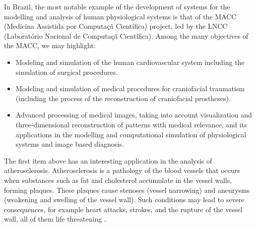In Brazil, the most notable example of the development of systems for the modelling and analysis of human physiological systems is that of the MACC (Medicina Assistida por Computa\c{c}\~a Cient\'ifica) project, led by the LNCC (Laborat\'orio Nacional de Computa\c{c}\~a Cient\'ifica). Among the many objectives of the MACC, we may highlight: 

\begin{itemize}
\item Modeling and simulation of the human cardiovascular system including the simulation of surgical procedures.
\item Modeling and simulation of medical procedures for craniofacial traumatism (including the process of the reconstruction of craniofacial prostheses).
\item Advanced processing of medical images, taking into account visualization and three-dimensional reconstruction of patterns with medical relevance, and its applications in the modelling and computational simulation of physiological systems and image based diagnosis.
\end{itemize}

The first item above has an interesting application in the analysis of atherosclerosis. Atherosclerosis is a pathology of the blood vessels that occurs when substances such as fat and cholesterol accumulate in the vessel walls, forming plaques. These plaques cause stenoses (vessel narrowing) and aneurysms (weakening and swelling of the vessel wall). Such conditions may lead to severe consequences, for example heart attacks, strokes, and the rupture of the vessel wall, all of them life threatening \citep{Gennest,Libby}.

